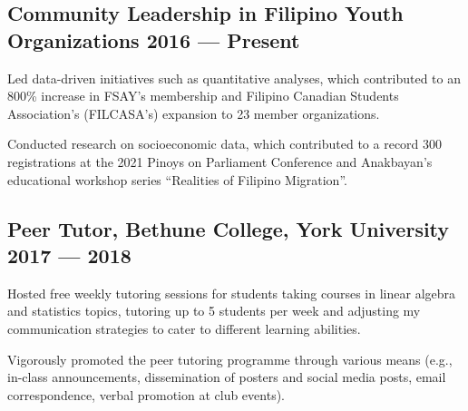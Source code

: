 \subsection{Community Leadership in Filipino Youth Organizations \hfill 2016 --- Present}
\begin{zitemize}
\item Led data-driven initiatives such as quantitative analyses, which contributed to an 800\% increase in FSAY’s
membership and Filipino Canadian Students Association’s (FILCASA’s) expansion to 23 member organizations.
\item  Conducted research on socioeconomic data, which contributed to a record 300 registrations at the 2021 Pinoys
on Parliament Conference and Anakbayan’s educational workshop series “Realities of Filipino Migration”.
\end{zitemize}

\subsection{Peer Tutor, Bethune College, York University \hfill 2017 --- 2018}
\begin{zitemize}
\item Hosted free weekly tutoring sessions for students taking courses in linear algebra and statistics topics, tutoring up to 5 students per week and adjusting my communication strategies to cater to different learning abilities.
\item Vigorously promoted the peer tutoring programme through various means (e.g., in-class announcements, dissemination of posters and social media posts, email correspondence, verbal promotion at club events).
\end{zitemize}